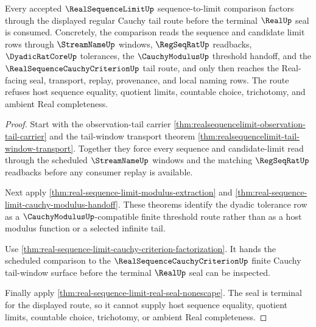 \begin{theorem}
\label{thm:real-sequence-limit-regular-cauchy-tail-factorization}
Every accepted $\RealSequenceLimitUp$ sequence-to-limit comparison factors through the displayed regular Cauchy tail route before the terminal $\RealUp$ seal is consumed. Concretely, the comparison reads the sequence and candidate limit rows through $\StreamNameUp$ windows, $\RegSeqRatUp$ readbacks, $\DyadicRatCoreUp$ tolerances, the $\CauchyModulusUp$ threshold handoff, and the $\RealSequenceCauchyCriterionUp$ tail route, and only then reaches the Real-facing seal, transport, replay, provenance, and local naming rows. The route refuses host sequence equality, quotient limits, countable choice, trichotomy, and ambient Real completeness.
\end{theorem}
\begin{proof}
Start with the observation-tail carrier \autoref{thm:realsequencelimit-observation-tail-carrier} and the tail-window transport theorem \autoref{thm:realsequencelimit-tail-window-transport}. Together they force every sequence and candidate-limit read through the scheduled $\StreamNameUp$ windows and the matching $\RegSeqRatUp$ readbacks before any consumer replay is available.

Next apply \autoref{thm:real-sequence-limit-modulus-extraction} and \autoref{thm:real-sequence-limit-cauchy-modulus-handoff}. These theorems identify the dyadic tolerance row as a $\CauchyModulusUp$-compatible finite threshold route rather than as a host modulus function or a selected infinite tail.

Use \autoref{thm:real-sequence-limit-cauchy-criterion-factorization}. It hands the scheduled comparison to the $\RealSequenceCauchyCriterionUp$ finite Cauchy tail-window surface before the terminal $\RealUp$ seal can be inspected.

Finally apply \autoref{thm:real-sequence-limit-real-seal-nonescape}. The seal is terminal for the displayed route, so it cannot supply host sequence equality, quotient limits, countable choice, trichotomy, or ambient Real completeness.
\end{proof}

